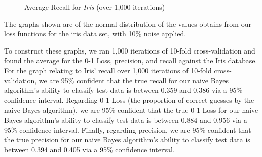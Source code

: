 \documentclass[twoside,11pt]{article}
\begin{document}
\begin{figure}[!hbp]
\begin{minipage}[b]{0.4\textwidth}
        \caption{Average Recall for \emph{Iris} (over 1,000 iterations)}
    \end{minipage}
\end{figure}

The graphs shown are of the normal distribution of the values obtains from our loss functions for the iris data set, with 10\% noise applied. 

To construct these graphs, we ran 1,000 iterations of 10-fold cross-validation and found the average for the 0-1 Loss, precision, and recall against the Iris database. For the graph relating to Iris' recall over 1,000 iterations of 10-fold cross-validation, we are 95\% confident that the true recall for our naive Bayes algorithm's ability to classify test data is between 0.359 and 0.386 via a 95\% confidence interval. Regarding 0-1 Loss (the proportion of correct guesses by the naive Bayes algorithm), we are 95\% confident that the true 0-1 Loss for our naive Bayes algorithm's ability to classify test data is between 0.884 and 0.956 via a 95\% confidence interval. Finally, regarding precision, we are 95\% confident that the true precision for our naive Bayes algorithm's ability to classify test data is between 0.394 and 0.405 via a 95\% confidence interval.


\end{document}
